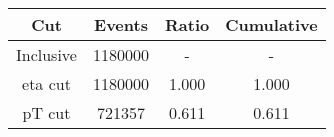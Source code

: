 \begin{tabular}{|c||c|c|c|}
\hline
Cut & Events & Ratio & Cumulative \\\hline
Inclusive & 1180000 & - & - \\
eta cut & 1180000 & 1.000 & 1.000 \\
pT cut & 721357 & 0.611 & 0.611 \\
\hline
\end{tabular}
